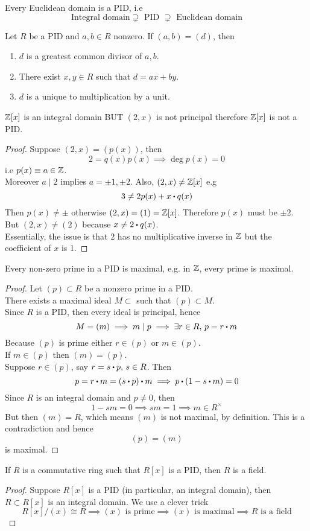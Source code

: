 \documentclass[../Main.tex]{subfiles}
\begin{document}
\begin{thm}
	Every Euclidean domain is a PID, i.e
	\[\text{Integral domain} \supsetneq \text{ PID } \supsetneq \text{ Euclidean domain}\]
\end{thm}
\begin{thm}
	Let $R$ be a PID and $a,b\in R$ nonzero.
	If $(a,b)=(d)$, then
	\begin{enumerate}[label=(\arabic*)]
		\item $d$ is a greatest common divisor of $a,b$.
		\item There exist $x,y\in R$ such that $d=ax+by$.
		\item $d$ is a unique to multiplication by a unit.
	\end{enumerate}
\end{thm}
\begin{claim}
	$\mathbb{Z}[x]$ is an integral domain BUT $(2,x)$ is not principal therefore $\mathbb{Z}[x]$ is not a PID.
\end{claim}
\begin{proof}
	Suppose $(2,x)=(p(x))$, then 
	\[2=q(x)p(x) \implies \deg p(x)=0\]
	i.e $p(x)\equiv a\in \mathbb{Z}$.\\
	Moreover $a\mid 2$ implies $a=\pm1,\pm2$. Also, $(2,x)\ne \mathbb{Z}[x]$ e.g
	\[3\ne 2p(x)+x\rdot q(x)\]
	Then $p(x)\ne \pm$ otherwise $(2,x)=(1)=\mathbb{Z}[x]$. Therefore $p(x)$ must be $\pm 2$.\\
	But $(2,x) \ne (2)$ because $x \ne 2\rdot q(x)$.\\
	Essentially, the issue is that $2$ has no multiplicative inverse in $\mathbb{Z}$ but the coefficient of $x$ is 1.
\end{proof}
\begin{thm}
	Every non-zero prime in a PID is maximal, e.g. in $\mathbb{Z}$, every prime is maximal.
\end{thm}
\begin{proof}
	Let $(p)\subset R$ be a nonzero prime in a PID.\\
	There exists a maximal ideal $M\subset $ such that $(p)\subset M$.\\
	Since $R$ is a PID, then every ideal is principal, hence
	\[M=(m) \implies m\mid p \implies \exists r\in R, \, p=r\rdot m\]
	Because $(p)$ is prime either $r\in (p)$ or $m \in (p)$.\\
	If $m\in (p)$ then $(m)=(p)$. \\
	Suppose $r\in (p)$, say $r=s\rdot p,\, s\in R$. Then 
	\[p=r\rdot m=(s\rdot p)\rdot m \implies p\rdot (1-s\rdot m)=0\]
	Since $R$ is an integral domain and $p\ne 0$, then 
	\[1-sm=0\implies sm =1 \implies  m\in R^\times\]
	But then $(m) = R$, which means $(m)$ is not maximal, by definition. This is a contradiction and hence 
	\[(p)=(m)\]
	is maximal.
\end{proof}
\begin{thm}
	If $R$ is a commutative ring such that $R[x]$ is a PID, then $R$ is a field.
\end{thm}
\begin{proof}
	Suppose $R[x]$ is a PID (in particular, an integral domain), then $R\subset R[x]$ is an integral domain. We use a clever trick
	\[R[x]/(x) \cong R \implies (x) \text{ is prime} \implies (x) \text{ is maximal} \implies R \text{ is a field}\]
\end{proof}
\end{document}

